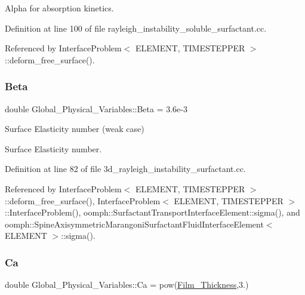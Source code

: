 Alpha for absorption kinetics. 



Definition at line 100 of file rayleigh\+\_\+instability\+\_\+soluble\+\_\+surfactant.\+cc.



Referenced by Interface\+Problem$<$ E\+L\+E\+M\+E\+N\+T, T\+I\+M\+E\+S\+T\+E\+P\+P\+E\+R $>$\+::deform\+\_\+free\+\_\+surface().

\mbox{\label{namespaceGlobal__Physical__Variables_a351a17b52cfcabc688393423f3de361b}} 
\subsubsection{\texorpdfstring{Beta}{Beta}}
{\footnotesize\ttfamily double Global\+\_\+\+Physical\+\_\+\+Variables\+::\+Beta = 3.\+6e-\/3}



Surface Elasticity number (weak case) 

Surface Elasticity number. 

Definition at line 82 of file 3d\+\_\+rayleigh\+\_\+instability\+\_\+surfactant.\+cc.



Referenced by Interface\+Problem$<$ E\+L\+E\+M\+E\+N\+T, T\+I\+M\+E\+S\+T\+E\+P\+P\+E\+R $>$\+::deform\+\_\+free\+\_\+surface(), Interface\+Problem$<$ E\+L\+E\+M\+E\+N\+T, T\+I\+M\+E\+S\+T\+E\+P\+P\+E\+R $>$\+::\+Interface\+Problem(), oomph\+::\+Surfactant\+Transport\+Interface\+Element\+::sigma(), and oomph\+::\+Spine\+Axisymmetric\+Marangoni\+Surfactant\+Fluid\+Interface\+Element$<$ E\+L\+E\+M\+E\+N\+T $>$\+::sigma().

\mbox{\label{namespaceGlobal__Physical__Variables_a8b32b93d2e546f9375ec418474107838}} 
\subsubsection{\texorpdfstring{Ca}{Ca}}
{\footnotesize\ttfamily double Global\+\_\+\+Physical\+\_\+\+Variables\+::\+Ca = pow(\hyperlink{namespaceGlobal__Physical__Variables_a4d1da0a125f6044733e121f0f3d958ca}{Film\+\_\+\+Thickness},3.)}



